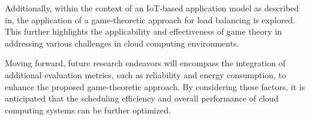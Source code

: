 \documentclass[conference]{IEEEtran}
\begin{document}
Additionally, within the context of an IoT-based application model as described in\cite{patra2017architecture}, the application of a game-theoretic approach for load balancing is explored. This further highlights the applicability and effectiveness of game theory in addressing various challenges in cloud computing environments.

Moving forward, future research endeavors will encompass the integration of additional evaluation metrics, such as reliability and energy consumption, to enhance the proposed game-theoretic approach. By considering these factors, it is anticipated that the scheduling efficiency and overall performance of cloud computing systems can be further optimized.










\end{document}
